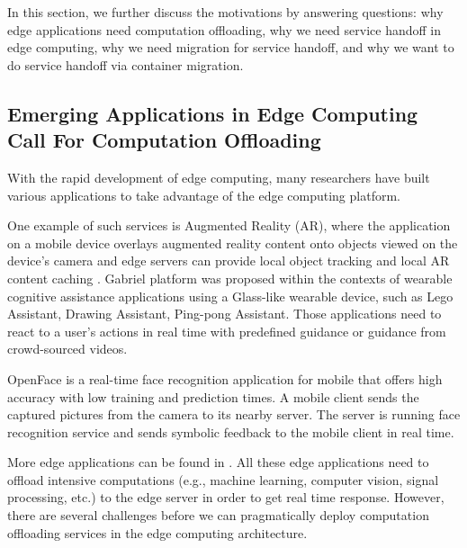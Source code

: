 In this section, we further discuss the motivations by answering
questions: why edge applications need computation offloading, why we need  
service handoff in edge computing, why we need migration for service handoff, and why we want to do service handoff via container migration.

\subsection{Emerging Applications in Edge Computing Call For Computation Offloading}

With the rapid development of edge computing, many researchers have built various applications to take advantage of the edge computing platform. 

One example of such services is Augmented Reality (AR), where the application on a mobile device overlays augmented reality content
onto objects viewed on the device's camera and edge servers can
provide local object tracking and local AR content caching
\cite{satya2009case,MEC2014initiative,MEC2015-5G,hao2017challenges}.
%
Gabriel platform \cite{ha2014wearable}  was proposed within the contexts of wearable cognitive assistance applications using a Glass-like wearable device, such as Lego Assistant, Drawing Assistant, Ping-pong Assistant. 
Those applications need to react to a user's actions in real time with predefined guidance or guidance from crowd-sourced videos. 
%
%


OpenFace\cite{openface2016} is a real-time face recognition application for mobile that offers high accuracy with low training and prediction times.  A mobile client sends the captured pictures from the camera to its nearby server. The server is running face recognition service and sends symbolic feedback to the mobile client in real time.  


More edge applications can be found in \cite{yi2015fog,yi2015survey,satya2017edge}.
%
All these edge applications need to offload intensive computations (e.g., machine learning, computer vision, signal processing, etc.) to the edge server in order to get real time response. However, there are several challenges before we can pragmatically deploy computation offloading services in the edge computing architecture. 

